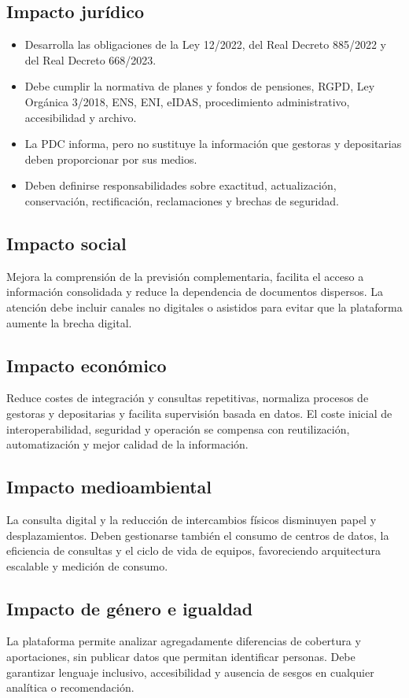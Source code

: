 \documentclass[11pt,a4paper]{article}
\begin{document}
\subsection{Impacto jurídico}
\begin{itemize}
\item Desarrolla las obligaciones de la Ley 12/2022, del Real Decreto 885/2022 y del Real Decreto 668/2023.
\item Debe cumplir la normativa de planes y fondos de pensiones, RGPD, Ley Orgánica 3/2018, ENS, ENI, eIDAS, procedimiento administrativo, accesibilidad y archivo.
\item La PDC informa, pero no sustituye la información que gestoras y depositarias deben proporcionar por sus medios.
\item Deben definirse responsabilidades sobre exactitud, actualización, conservación, rectificación, reclamaciones y brechas de seguridad.
\end{itemize}

\subsection{Impacto social}
Mejora la comprensión de la previsión complementaria, facilita el acceso a información consolidada y reduce la dependencia de documentos dispersos. La atención debe incluir canales no digitales o asistidos para evitar que la plataforma aumente la brecha digital.

\subsection{Impacto económico}
Reduce costes de integración y consultas repetitivas, normaliza procesos de gestoras y depositarias y facilita supervisión basada en datos. El coste inicial de interoperabilidad, seguridad y operación se compensa con reutilización, automatización y mejor calidad de la información.

\subsection{Impacto medioambiental}
La consulta digital y la reducción de intercambios físicos disminuyen papel y desplazamientos. Deben gestionarse también el consumo de centros de datos, la eficiencia de consultas y el ciclo de vida de equipos, favoreciendo arquitectura escalable y medición de consumo.

\subsection{Impacto de género e igualdad}
La plataforma permite analizar agregadamente diferencias de cobertura y aportaciones, sin publicar datos que permitan identificar personas. Debe garantizar lenguaje inclusivo, accesibilidad y ausencia de sesgos en cualquier analítica o recomendación.
\end{document}
